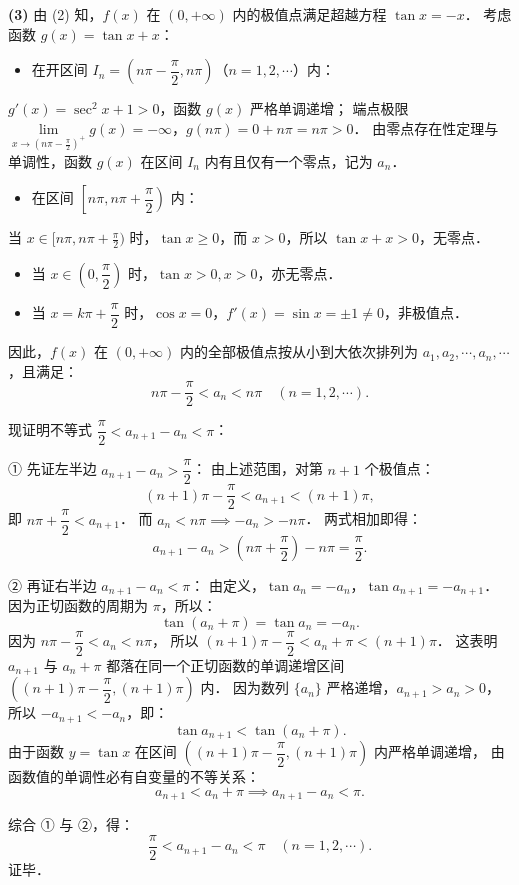 \begin{answer}
\textbf{(3)}
由 (2) 知，$f(x)$ 在 $(0, +\infty)$ 内的极值点满足超越方程 $\tan x = -x$．
考虑函数 $g(x) = \tan x + x$：
\begin{itemize}
\item 在开区间 $I_n = \left(n\pi - \dfrac{\pi}{2}, n\pi\right)$（$n = 1, 2, \cdots$）内：
\end{itemize}
  $g'(x) = \sec^2 x + 1 > 0$，函数 $g(x)$ 严格单调递增；
  端点极限 $\lim\limits_{x \to (n\pi - \frac{\pi}{2})^+} g(x) = -\infty$，$g(n\pi) = 0 + n\pi = n\pi > 0$．
  由零点存在性定理与单调性，函数 $g(x)$ 在区间 $I_n$ 内有且仅有一个零点，记为 $a_n$．
\begin{itemize}
\item 在区间 $\left[n\pi, n\pi + \dfrac{\pi}{2}\right)$ 内：
\end{itemize}
  当 $x \in [n\pi, n\pi + \frac{\pi}{2})$ 时，$\tan x \geqslant 0$，而 $x > 0$，所以 $\tan x + x > 0$，无零点．
\begin{itemize}
\item 当 $x \in \left(0, \dfrac{\pi}{2}\right)$ 时，$\tan x > 0, x > 0$，亦无零点．
\item 当 $x = k\pi + \dfrac{\pi}{2}$ 时，$\cos x = 0$，$f'(x) = \sin x = \pm 1 \neq 0$，非极值点．
\end{itemize}
因此，$f(x)$ 在 $(0, +\infty)$ 内的全部极值点按从小到大依次排列为 $a_1, a_2, \cdots, a_n, \cdots$，且满足：
\nopagebreak[4]
\[
n\pi - \dfrac{\pi}{2} < a_n < n\pi \quad (n = 1, 2, \cdots).
\]

现证明不等式 $\dfrac{\pi}{2} < a_{n+1} - a_n < \pi$：

① 先证左半边 $a_{n+1} - a_n > \dfrac{\pi}{2}$：
由上述范围，对第 $n+1$ 个极值点：
\nopagebreak[4]
\[
(n+1)\pi - \dfrac{\pi}{2} < a_{n+1} < (n+1)\pi,
\]
即 $n\pi + \dfrac{\pi}{2} < a_{n+1}$．
而 $a_n < n\pi \implies -a_n > -n\pi$．
两式相加即得：
\nopagebreak[4]
\[
a_{n+1} - a_n > \left(n\pi + \dfrac{\pi}{2}\right) - n\pi = \dfrac{\pi}{2}.
\]

② 再证右半边 $a_{n+1} - a_n < \pi$：
由定义，$\tan a_n = -a_n$，$\tan a_{n+1} = -a_{n+1}$．
因为正切函数的周期为 $\pi$，所以：
\nopagebreak[4]
\[
\tan(a_n + \pi) = \tan a_n = -a_n.
\]
因为 $n\pi - \dfrac{\pi}{2} < a_n < n\pi$，
所以 $(n+1)\pi - \dfrac{\pi}{2} < a_n + \pi < (n+1)\pi$．
这表明 $a_{n+1}$ 与 $a_n + \pi$ 都落在同一个正切函数的单调递增区间 $\left((n+1)\pi - \dfrac{\pi}{2}, (n+1)\pi\right)$ 内．
因为数列 $\{a_n\}$ 严格递增，$a_{n+1} > a_n > 0$，
所以 $-a_{n+1} < -a_n$，即：
\nopagebreak[4]
\[
\tan a_{n+1} < \tan(a_n + \pi).
\]
由于函数 $y = \tan x$ 在区间 $\left((n+1)\pi - \dfrac{\pi}{2}, (n+1)\pi\right)$ 内严格单调递增，
由函数值的单调性必有自变量的不等关系：
\nopagebreak[4]
\[
a_{n+1} < a_n + \pi \implies a_{n+1} - a_n < \pi.
\]

综合 ① 与 ②，得：
\nopagebreak[4]
\[
\dfrac{\pi}{2} < a_{n+1} - a_n < \pi \quad (n = 1, 2, \cdots).
\]
证毕．




\end{answer}